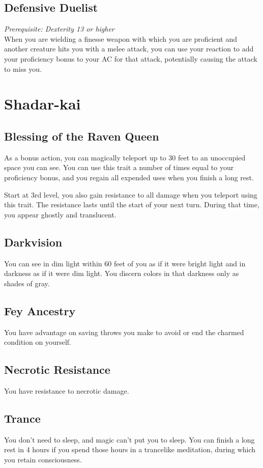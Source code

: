 \documentclass[letterpaper,justified,openany,oneside,twocolumn]{dndbook}
\begin{document}
\subsection*{Defensive Duelist}
\textit{Prerequisite: Dexterity 13 or higher}\\
When you are wielding a finesse weapon with which you are proficient and another creature hits you with a melee attack, you can use your reaction to add your proficiency bonus to your AC for that attack, potentially causing the attack to miss you.

\section*{Shadar-kai}
\subsection*{Blessing of the Raven Queen}
As a bonus action, you can magically teleport up to 30 feet to an unoccupied space you can see. You can use this trait a number of times equal to your proficiency bonus, and you regain all expended uses when you finish a long rest.

Start at 3rd level, you also gain resistance to all damage when you teleport using this trait. The resistance lasts until the start of your next turn. During that time, you appear ghostly and translucent.

\subsection*{Darkvision}
You can see in dim light within 60 feet of you as if it were bright light and in darkness as if it were dim light. You discern colors in that darkness only as shades of gray.

\subsection*{Fey Ancestry}
You have advantage on saving throws you make to avoid or end the charmed condition on yourself.

\subsection*{Necrotic Resistance}
You have resistance to necrotic damage.

\subsection*{Trance}
You don't need to sleep, and magic can't put you to sleep. You can finish a long rest in 4 hours if you spend those hours in a trancelike meditation, during which you retain consciousness.
\end{document}
